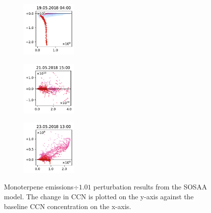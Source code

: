 \begin{figure}[H]
    \begin{subfigure}
        \centering
        \includegraphics[width=0.30\textwidth,valign=t]{evaluation/figures/perturbations/perturbation-19.05.2018:04.00-monoterpenes-div-1.01.pdf}
    \end{subfigure}
    \begin{subfigure}
        \centering
        \includegraphics[width=0.30\textwidth,valign=t]{evaluation/figures/perturbations/perturbation-21.05.2018:15.00-monoterpenes-div-1.01.pdf}
    \end{subfigure}
    \begin{subfigure}
        \centering
        \includegraphics[width=0.30\textwidth,valign=t]{evaluation/figures/perturbations/perturbation-23.05.2018:13.00-monoterpenes-div-1.01.pdf}
    \end{subfigure}

    \caption[Monoterpene emissions$\div 1.01$ perturbation SOSAA results]{Monoterpene emissions$\div 1.01$ perturbation results from the SOSAA model. The change in CCN is plotted on the y-axis against the baseline CCN concentration on the x-axis.}
    \label{fig:sosaa-perturbation-monoterpenes-div-1.01}
\end{figure}

